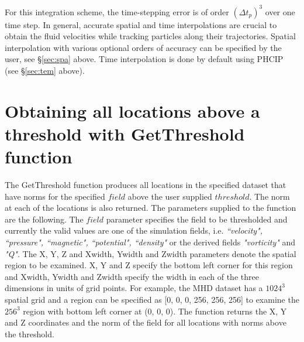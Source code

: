 \documentclass[11pt]{article}
\begin{document}
For this integration scheme, the time-stepping error is of order $(\Delta t_p)^3$ over one time step. In general, accurate spatial and time interpolations are crucial to obtain the fluid velocities while tracking particles along their trajectories. Spatial interpolation with various optional orders of accuracy can be specified by the user, see \S\ref{sec:spa}  above. Time interpolation is done by default using PHCIP (see \S\ref{sec:tem} above).


\section{Obtaining all locations above a threshold with GetThreshold function}

The GetThreshold function produces all locations in the specified dataset that have norms for the specified $field$ above the user supplied $threshold$. 
The norm at each of the locations is also returned. The parameters supplied to the function are the following. The $field$ parameter specifies the field to be
thresholded and currently the valid values are one of the simulation fields, i.e. \emph{``velocity", ``pressure", ``magnetic", ``potential", ``density"} or
the derived fields \emph{"vorticity"} and \emph{"Q"}. The X, Y, Z and Xwidth, Ywidth and Zwidth parameters denote the spatial region to be examined. X, Y and Z specify
the bottom left corner for this region and Xwidth, Ywidth and Zwidth specify the width in each of the three dimensions in units of grid points. For example, 
the MHD dataset has a $1024^3$ spatial grid and a region can be specified as [0, 0, 0, 256, 256, 256] to examine the $256^3$ region with bottom left corner at
(0, 0, 0). The function returns the X, Y and Z coordinates and the norm of the field for all locations with norms above the threshold.



\end{document}
